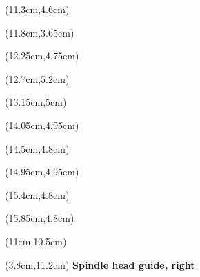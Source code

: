 \begin{textblock*}{3cm}(11.3cm,4.6cm)
    {}
\end{textblock*}

\begin{textblock*}{3cm}(11.8cm,3.65cm)
    {}
\end{textblock*}

\begin{textblock*}{3cm}(12.25cm,4.75cm)
    {}
\end{textblock*}

\begin{textblock*}{3cm}(12.7cm,5.2cm)
    {}
\end{textblock*}

\begin{textblock*}{3cm}(13.15cm,5cm)
    {}
\end{textblock*}

\begin{textblock*}{3cm}(14.05cm,4.95cm)
    {}
\end{textblock*}

\begin{textblock*}{3cm}(14.5cm,4.8cm)
    {}
\end{textblock*}

\begin{textblock*}{3cm}(14.95cm,4.95cm)
    {}
\end{textblock*}

\begin{textblock*}{3cm}(15.4cm,4.8cm)
    {}
\end{textblock*}

\begin{textblock*}{3cm}(15.85cm,4.8cm)
    {}
\end{textblock*}

\begin{textblock*}{3cm}(11cm,10.5cm)
    {}
    {}
\end{textblock*}

\begin{textblock*}{5cm}(3.8cm,11.2cm)
    \textbf{Spindle head guide, right}
\end{textblock*}

